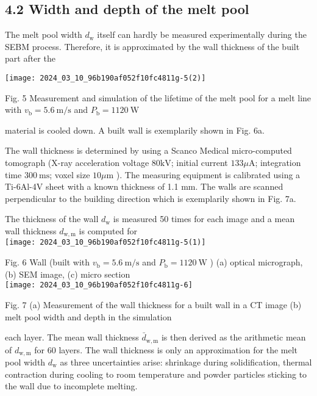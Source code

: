 \documentclass[10pt]{article}
\begin{document}
\subsection*{4.2 Width and depth of the melt pool}
The melt pool width $d_{\mathrm{w}}$ itself can hardly be measured experimentally during the SEBM process. Therefore, it is approximated by the wall thickness of the built part after the

\begin{center}
\texttt{[image: 2024\_03\_10\_96b190af052f10fc4811g-5(2)]}
\end{center}

Fig. 5 Measurement and simulation of the lifetime of the melt pool for a melt line with $v_{\mathrm{b}}=5.6 \mathrm{~m} / \mathrm{s}$ and $P_{\mathrm{b}}=1120 \mathrm{~W}$

material is cooled down. A built wall is exemplarily shown in Fig. 6a.

The wall thickness is determined by using a Scanco Medical micro-computed tomograph (X-ray acceleration voltage $80 \mathrm{kV}$; initial current $133 \mu \mathrm{A}$; integration time $300 \mathrm{~ms}$; voxel size $10 \mu \mathrm{m}$ ). The measuring equipment is calibrated using a Ti-6Al-4V sheet with a known thickness of 1.1 $\mathrm{mm}$. The walls are scanned perpendicular to the building direction which is exemplarily shown in Fig. 7a.

The thickness of the wall $d_{\mathrm{w}}$ is measured 50 times for each image and a mean wall thickness $d_{\mathrm{w}, \mathrm{m}}$ is computed for\\
\texttt{[image: 2024\_03\_10\_96b190af052f10fc4811g-5(1)]}

Fig. 6 Wall (built with $v_{\mathrm{b}}=5.6 \mathrm{~m} / \mathrm{s}$ and $P_{\mathrm{b}}=1120 \mathrm{~W}$ ) (a) optical micrograph, (b) SEM image, (c) micro section\\
\texttt{[image: 2024\_03\_10\_96b190af052f10fc4811g-6]}

Fig. 7 (a) Measurement of the wall thickness for a built wall in a CT image (b) melt pool width and depth in the simulation

each layer. The mean wall thickness $\bar{d}_{\mathrm{w}, \mathrm{m}}$ is then derived as the arithmetic mean of $d_{\mathrm{w}, \mathrm{m}}$ for 60 layers. The wall thickness is only an approximation for the melt pool width $d_{\mathrm{w}}$ as three uncertainties arise: shrinkage during solidification, thermal contraction during cooling to room temperature and powder particles sticking to the wall due to incomplete melting.
\end{document}
